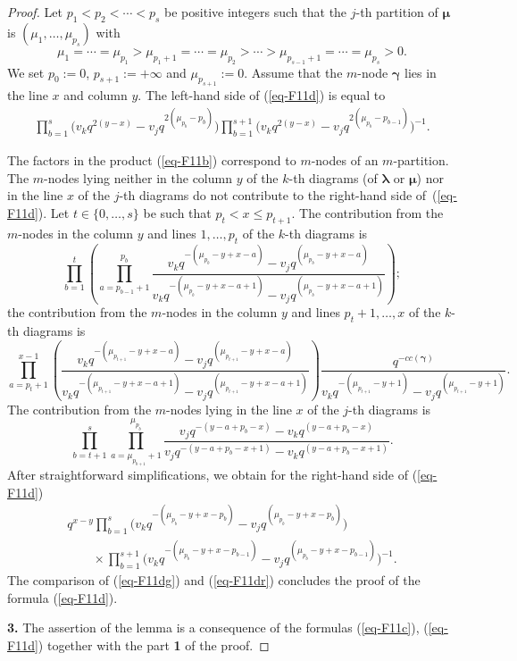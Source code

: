 \documentclass[pdftex]{sigma}
\newcommand{\cc}{cc}
\newcommand{\lam}{\boldsymbol{\lambda}}
\newcommand{\mum}{\boldsymbol{\mu}}
\newcommand{\gam}{\boldsymbol{\gamma}}
\begin{document}
\begin{proof}
Let $p_1<p_2<\cdots<p_s$ be positive integers such that the $j$-th partition of $\mum$ is $(\mu_1,\dots,\mu_{p_s})$ with
\[
\mu_1=\cdots=\mu_{p_1}>\mu_{p_1+1}=\cdots=\mu_{p_2}>\cdots >\mu_{p_{s-1}+1}=\cdots=\mu_{p_s}>0  .
\]
We set $p_0:=0$, $p_{s+1}:=+\infty$ and $\mu_{p_{s+1}}:=0$.
Assume that the $m$-node $\gam$ lies in the line $x$ and column $y$.
The left-hand side of (\ref{eq-F11d}) is equal to
\begin{gather}\label{eq-F11dg}
\prod_{b=1}^s\big(v_kq^{2(y-x)}-v_jq^{2(\mu_{p_b}-p_b)}\big)  \prod_{b=1}^{s+1}\big(v_kq^{2(y-x)}-v_jq^{2(\mu_{p_b}-p_{b-1})}\big)^{-1} .
\end{gather}

The factors in the product (\ref{eq-F11b}) correspond to
$m$-nodes of an $m$-partition.
The $m$-nodes  lying neither in the column $y$ of the $k$-th diagrams (of $\lam$ or $\mum$) nor in the line $x$ of the $j$-th
diagrams do not contribute to the right-hand side of~(\ref{eq-F11d}).
Let $t\in\{0,\dots,s\}$ be such that $p_t<x\leq p_{t+1}$. The contribution from the $m$-nodes in the column $y$ and lines $1,\dots,p_t$ of the $k$-th diagrams is
\[
\prod_{b=1}^t\left(\prod_{a=p_{b-1}+1}^{p_b}\frac{v_kq^{-(\mu_{p_b}-y+x-a)}-v_jq^{(\mu_{p_b}-y+x-a)}}
{v_kq^{-(\mu_{p_b}-y+x-a+1)}-v_jq^{(\mu_{p_b}-y+x-a+1)}}\right);
\]
the contribution from the $m$-nodes in the column $y$ and lines $p_t+1,\dots,x$ of the $k$-th diagrams is
\[
\prod_{a=p_t+1}^{x-1}\left(\frac{v_kq^{-(\mu_{p_{t+1}}-y+x-a)}-v_jq^{(\mu_{p_{t+1}}-y+x-a)}}
{v_kq^{-(\mu_{p_{t+1}}-y+x-a+1)}-v_jq^{(\mu_{p_{t+1}}-y+x-a+1)}}\right) \frac{q^{-\cc(\gam)}}{v_kq^{-(\mu_{p_{t+1}}-y+1)}-v_jq^{(\mu_{p_{t+1}}-y+1)}} .
\]
The contribution from the $m$-nodes lying in the line $x$ of the $j$-th diagrams is
\[
\prod_{b=t+1}^s\prod_{a=\mu_{p_{b+1}}+1}^{\mu_{p_b}}\frac{v_jq^{-(y-a+p_b-x)}-v_kq^{(y-a+p_b-x)}}{v_jq^{-(y-a+p_b-x+1)}-v_kq^{(y-a+p_b-x+1)}} .
\]
After straightforward simplif\/ications, we obtain for the right-hand side of (\ref{eq-F11d})
\begin{gather}
q^{x-y}\prod_{b=1}^s\bigl(v_kq^{-(\mu_{p_b}-y+x-p_b)} -v_jq^{(\mu_{p_b}-y+x-p_b)}\bigr)\nonumber\\
\qquad {}\times \prod_{b=1}^{s+1}\bigl(v_kq^{-(\mu_{p_b}-y+x-p_{b-1})} -v_jq^{(\mu_{p_b}-y+x-p_{b-1})}\bigr)^{-1} .\label{eq-F11dr}
\end{gather}
The comparison of (\ref{eq-F11dg}) and (\ref{eq-F11dr}) concludes the proof of the formula (\ref{eq-F11d}).


 {\bf 3.} The assertion of the lemma is a consequence of the formulas (\ref{eq-F11c}),
 (\ref{eq-F11d}) together with the part {\bf 1} of the proof.
\end{proof}
\end{document}
